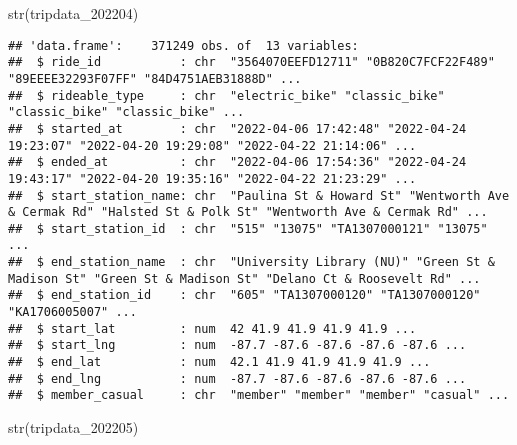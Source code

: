 \documentclass[
]{article}
\newenvironment{Shaded}{\begin{snugshade}}{\end{snugshade}}
\newcommand{\FunctionTok}[1]{\textcolor[rgb]{0.00,0.00,0.00}{#1}}
\newcommand{\NormalTok}[1]{#1}
\begin{document}
\begin{Shaded}
\begin{Highlighting}[]
\FunctionTok{str}\NormalTok{(tripdata\_202204)}
\end{Highlighting}
\end{Shaded}

\begin{verbatim}
## 'data.frame':    371249 obs. of  13 variables:
##  $ ride_id           : chr  "3564070EEFD12711" "0B820C7FCF22F489" "89EEEE32293F07FF" "84D4751AEB31888D" ...
##  $ rideable_type     : chr  "electric_bike" "classic_bike" "classic_bike" "classic_bike" ...
##  $ started_at        : chr  "2022-04-06 17:42:48" "2022-04-24 19:23:07" "2022-04-20 19:29:08" "2022-04-22 21:14:06" ...
##  $ ended_at          : chr  "2022-04-06 17:54:36" "2022-04-24 19:43:17" "2022-04-20 19:35:16" "2022-04-22 21:23:29" ...
##  $ start_station_name: chr  "Paulina St & Howard St" "Wentworth Ave & Cermak Rd" "Halsted St & Polk St" "Wentworth Ave & Cermak Rd" ...
##  $ start_station_id  : chr  "515" "13075" "TA1307000121" "13075" ...
##  $ end_station_name  : chr  "University Library (NU)" "Green St & Madison St" "Green St & Madison St" "Delano Ct & Roosevelt Rd" ...
##  $ end_station_id    : chr  "605" "TA1307000120" "TA1307000120" "KA1706005007" ...
##  $ start_lat         : num  42 41.9 41.9 41.9 41.9 ...
##  $ start_lng         : num  -87.7 -87.6 -87.6 -87.6 -87.6 ...
##  $ end_lat           : num  42.1 41.9 41.9 41.9 41.9 ...
##  $ end_lng           : num  -87.7 -87.6 -87.6 -87.6 -87.6 ...
##  $ member_casual     : chr  "member" "member" "member" "casual" ...
\end{verbatim}

\begin{Shaded}
\begin{Highlighting}[]
\FunctionTok{str}\NormalTok{(tripdata\_202205)}
\end{Highlighting}
\end{Shaded}
\end{document}
